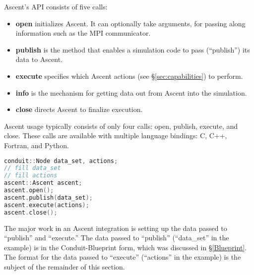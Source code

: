 %

Ascent's API consists of five calls:
%
\begin{itemize}
  \item \textbf{open} initializes Ascent.  It can optionally take arguments, for passing along
information such as the MPI communicator.
%
  \item \textbf{publish} is the method that enables a simulation code to pass (``publish'') its data
to Ascent.  
%
   \item \textbf{execute} specifies which Ascent actions (see \S\ref{sec:capabilities}) to perform.  
%
%
  \item \textbf{info} is the mechanism for getting data out from Ascent into the simulation.
%
%
  \item \textbf{close} directs Ascent to finalize execution.
\end{itemize}

Ascent usage typically consists of only four calls: open, publish, execute, and close.
%
These calls are available with multiple language bindings: C, C++, Fortran, and Python.
%
%
\begin{lstlisting}[language=C++,caption={\label{listing:ascent_api}Typical Ascent usage in C++.
The code for ``fill data\_set'' can be found in listing~\ref{ex:blueprint}, while the code
for ``fill actions'' can be found in listing~\ref{listing:actions}.}]
conduit::Node data_set, actions;
// fill data_set 
// fill actions 
ascent::Ascent ascent;
ascent.open();
ascent.publish(data_set);
ascent.execute(actions);
ascent.close();
\end{lstlisting}

The major work in an Ascent integration is setting up the data passed to ``publish'' and
``execute.''
%
The data passed to ``publish'' (``data\_set'' in the example) is in the Conduit-Blueprint form, which was discussed in \S\ref{Blueprint}.
%
The format for the data passed to ``execute'' (``actions'' in the example) 
is the subject of the remainder of this section.
%


